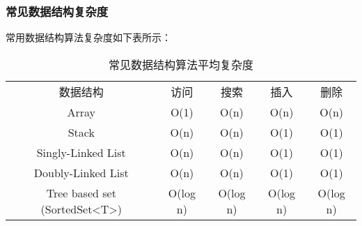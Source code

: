 \documentclass[../../../interview-questions.tex]{subfiles}
\begin{document}
\subsubsection{常见数据结构复杂度}

常用数据结构算法复杂度如下表所示：

\begin{table}[htbp]
	\caption{常见数据结构算法平均复杂度}
	\label{table:mapo3}
	\begin{center}
		\begin{tabular}{ccccc}
			\hline
			\multirow{1}{*}{数据结构}
			& \multicolumn{1}{c}{访问} 
			& \multicolumn{1}{c}{搜索}
			& \multicolumn{1}{c}{插入}
			& \multicolumn{1}{c}{删除}\\			
			\cline{1-5}
			Array &  O(1)  &  O(n) & O(n) & O(n)\\
			\hline
			Stack & O(n) & O(n) & O(1) & O(1) \\
			\hline
			Singly-Linked List &  O(n) & O(n) & O(1) & O(1) \\
			\hline	
			Doubly-Linked List & O(n) & O(n) & O(1) &  O(1)\\
			\hline
			Tree based set (SortedSet<T>) & O(log n) & O(log n) & O(log n) &  O(log n)\\
			\hline						
		\end{tabular}	
	\end{center}
\end{table}
\end{document}
